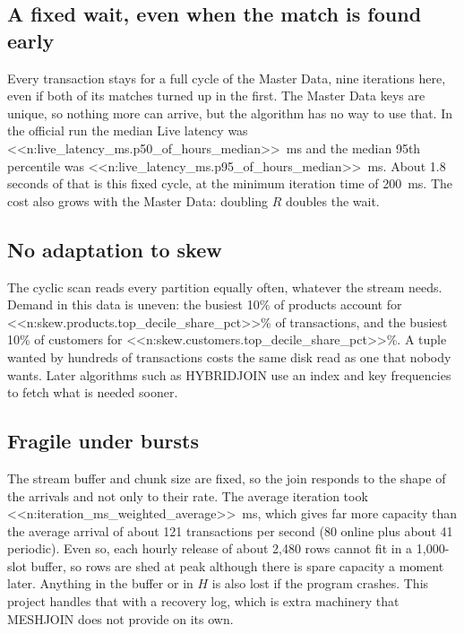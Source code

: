 \documentclass[11pt,a4paper]{article}
\begin{document}
\subsection{A fixed wait, even when the match is found early}

Every transaction stays for a full cycle of the Master Data, nine iterations here, even if both of its matches turned up in the first. The Master Data keys are unique, so nothing more can arrive, but the algorithm has no way to use that. In the official run the median Live latency was <<n:live_latency_ms.p50_of_hours_median>>~ms and the median 95th percentile was <<n:live_latency_ms.p95_of_hours_median>>~ms. About 1.8 seconds of that is this fixed cycle, at the minimum iteration time of 200~ms. The cost also grows with the Master Data: doubling $R$ doubles the wait.

\subsection{No adaptation to skew}

The cyclic scan reads every partition equally often, whatever the stream needs. Demand in this data is uneven: the busiest 10\% of products account for <<n:skew.products.top_decile_share_pct>>\% of transactions, and the busiest 10\% of customers for <<n:skew.customers.top_decile_share_pct>>\%. A tuple wanted by hundreds of transactions costs the same disk read as one that nobody wants. Later algorithms such as HYBRIDJOIN use an index and key frequencies to fetch what is needed sooner.

\subsection{Fragile under bursts}

The stream buffer and chunk size are fixed, so the join responds to the shape of the arrivals and not only to their rate. The average iteration took <<n:iteration_ms_weighted_average>>~ms, which gives far more capacity than the average arrival of about 121 transactions per second (80 online plus about 41 periodic). Even so, each hourly release of about 2,480 rows cannot fit in a 1,000-slot buffer, so rows are shed at peak although there is spare capacity a moment later. Anything in the buffer or in $H$ is also lost if the program crashes. This project handles that with a recovery log, which is extra machinery that MESHJOIN does not provide on its own.

\end{document}
